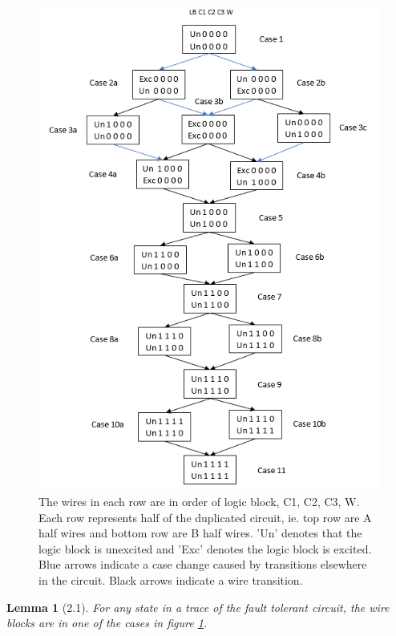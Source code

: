 \documentclass[12pt]{report}
\newtheorem*{lemma}{Lemma}
\begin{document}
\begin{figure}
  \centering
    \includegraphics{flowl2c3}
  \caption{The wires in each row are in order of logic block, C1, C2, C3, W.  Each row represents half of the duplicated circuit, ie. top row are A half wires and bottom row are B half wires.  'Un' denotes that the logic block is unexcited and 'Exc' denotes the logic block is excited.  Blue arrows indicate a case change caused by transitions elsewhere in the circuit.  Black arrows indicate a wire transition.}
  \label{fig:l21}
\end{figure}
\begin{lemma}[2.1]
For any state in a trace of the fault tolerant circuit, the wire blocks are in one of the cases in figure \ref{fig:l21}.
\end{lemma}
\end{document}
